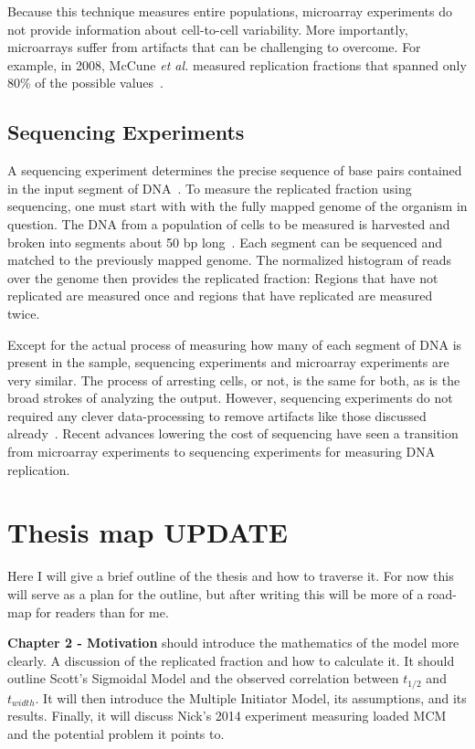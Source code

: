		Because this technique measures entire populations, microarray experiments do not provide information about cell-to-cell variability.
		More importantly, microarrays suffer from artifacts that can be challenging to overcome.
		For example, in 2008, McCune \emph{et al.} measured replication fractions that spanned only 80\% of the possible values~\cite{McCuneMicroArray}.
		
		
		\subsection{Sequencing Experiments}
		\label{subsec:Sequencing}
		
		A sequencing experiment determines the precise sequence of base pairs contained in the input segment of DNA~\cite{SequencingReview}.
		To measure the replicated fraction using sequencing, one must start with with the fully mapped genome of the organism in question.
		The DNA from a population of cells to be measured is harvested and broken into segments about 50 bp long~\cite{StochasticTermination}.
		Each segment can be sequenced and matched to the previously mapped genome.
		The normalized histogram of reads over the genome then provides the replicated fraction:
		Regions that have not replicated are measured once and regions that have replicated are measured twice.
		
		Except for the actual process of measuring how many of each segment of DNA is present in the sample, sequencing experiments and microarray experiments are very similar.
		The process of arresting cells, or not, is the same for both, as is the broad strokes of analyzing the output.
		However, sequencing experiments do not required any clever data-processing to remove artifacts like those discussed already~\cite{EndOfMicroarray}.
		Recent advances lowering the cost of sequencing have seen a transition from microarray experiments to sequencing experiments for measuring DNA replication.
		
		
	\section{Thesis map \textbf{UPDATE}}
	\label{sec:Map}

	Here I will give a brief outline of the thesis and how to traverse it. For now this will serve as a plan for the outline, but after writing this will be more of a road-map for readers than for me.
	
	\textbf{Chapter 2 - Motivation}
	should introduce the mathematics of the model more clearly.
	A discussion of the replicated fraction and how to calculate it.
	It should outline Scott's Sigmoidal Model and the observed correlation between $t_{1/2}$ and $t_{width}$.
	It will then introduce the Multiple Initiator Model, its assumptions, and its results.
	Finally, it will discuss Nick's 2014 experiment measuring loaded MCM and the potential problem it points to.
	
